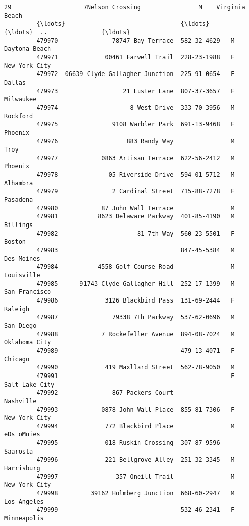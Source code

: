 \documentclass[11pt]{article}
\begin{document}
\begin{Verbatim}[commandchars=\\\{\}]
         29                    7Nelson Crossing                M    Virginia Beach   
         {\ldots}                                {\ldots}          {\ldots}  ..               {\ldots}   
         479970               78747 Bay Terrace  582-32-4629   M     Daytona Beach   
         479971             00461 Farwell Trail  228-23-1988   F     New York City   
         479972  06639 Clyde Gallagher Junction  225-91-0654   F            Dallas   
         479973                  21 Luster Lane  807-37-3657   F         Milwaukee   
         479974                    8 West Drive  333-70-3956   M          Rockford   
         479975               9108 Warbler Park  691-13-9468   F           Phoenix   
         479976                   883 Randy Way                M              Troy   
         479977            0863 Artisan Terrace  622-56-2412   M           Phoenix   
         479978              05 Riverside Drive  594-01-5712   M          Alhambra   
         479979               2 Cardinal Street  715-88-7278   F          Pasadena   
         479980            87 John Wall Terrace                M                     
         479981           8623 Delaware Parkway  401-85-4190   M          Billings   
         479982                      81 7th Way  560-23-5501   F            Boston   
         479983                                  847-45-5384   M        Des Moines   
         479984           4558 Golf Course Road                M        Louisville   
         479985      91743 Clyde Gallagher Hill  252-17-1399   M     San Francisco   
         479986             3126 Blackbird Pass  131-69-2444   F           Raleigh   
         479987               79338 7th Parkway  537-62-0696   M         San Diego   
         479988            7 Rockefeller Avenue  894-08-7024   M     Oklahoma City   
         479989                                  479-13-4071   F           Chicago   
         479990             419 Maxllard Street  562-78-9050   M                     
         479991                                                F    Salt Lake City   
         479992               867 Packers Court                          Nashville   
         479993            0878 John Wall Place  855-81-7306   F     New York City   
         479994             772 Blackbird Place                M        eDs oMnies   
         479995             018 Ruskin Crossing  307-87-9596              Saarosta   
         479996             221 Bellgrove Alley  251-32-3345   M        Harrisburg   
         479997                357 Oneill Trail                M     New York City   
         479998         39162 Holmberg Junction  668-60-2947   M       Los Angeles   
         479999                                  532-46-2341   F       Minneapolis   
         

\end{Verbatim}
\end{document}
